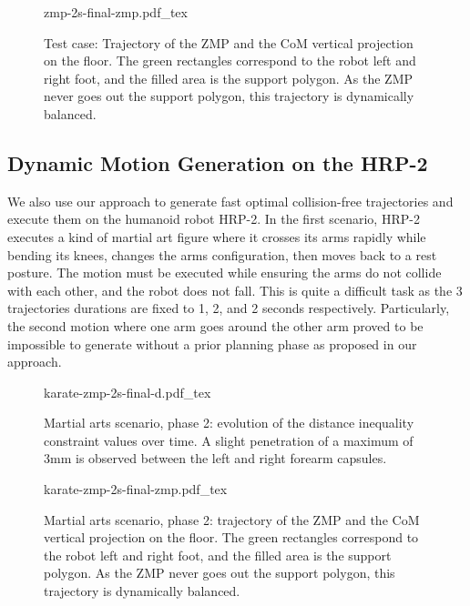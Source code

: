 \begin{figure}
  \centering
      {\def\svgwidth{0.8\linewidth}
        {\scriptsize
          
                     {zmp-2s-final-zmp.pdf_tex}
        }
      }
  \caption{Test case: Trajectory of the ZMP and the CoM vertical
    projection on the floor. The green rectangles correspond to the
    robot left and right foot, and the filled area is the support
    polygon. As the ZMP never goes out the support polygon, this
    trajectory is dynamically balanced.}
  \label{fig:chap3-zmp-2s-final-zmp}
\end{figure}

\subsection{Dynamic Motion Generation on the HRP-2}

We also use our approach to generate fast optimal collision-free
trajectories and execute them on the humanoid robot HRP-2. In the
first scenario, HRP-2 executes a kind of martial art figure where it
crosses its arms rapidly while bending its knees, changes the arms
configuration, then moves back to a rest posture. The motion must be
executed while ensuring the arms do not collide with each other, and
the robot does not fall. This is quite a difficult task as the 3
trajectories durations are fixed to 1, 2, and 2 seconds
respectively. Particularly, the second motion where one arm goes
around the other arm proved to be impossible to generate without a
prior planning phase as proposed in our approach.

\begin{figure}
  \centering
      {\def\svgwidth{0.8\linewidth}
        {\scriptsize
          
                     {karate-zmp-2s-final-d.pdf_tex}
        }
      }
  \caption{Martial arts scenario, phase 2: evolution of the distance
    inequality constraint values over time. A slight penetration of a
    maximum of 3mm is observed between the left and right forearm
    capsules.}
  \label{fig:chap3-karate-zmp-2s-final-d}
\end{figure}

\begin{figure}
  \centering
      {\def\svgwidth{0.8\linewidth}
        {\scriptsize
          
                     {karate-zmp-2s-final-zmp.pdf_tex}
        }
      }
  \caption{Martial arts scenario, phase 2: trajectory of the ZMP and
    the CoM vertical projection on the floor. The green rectangles
    correspond to the robot left and right foot, and the filled area
    is the support polygon. As the ZMP never goes out the support
    polygon, this trajectory is dynamically balanced.}
  \label{fig:chap3-karate-zmp-2s-final-zmp}
\end{figure}

